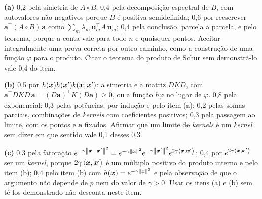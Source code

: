 \documentclass[11pt,a4paper]{article}
\begin{document}


\begin{criterio}
\textbf{(a)} 0,2 pela simetria de $A\circ B$; 0,4 pela decomposição espectral de $B$,
com autovalores não negativos porque $B$ é positiva semidefinida; 0,6 por reescrever
$\bm a^\top(A\circ B)\,\bm a$ como $\sum_m\lambda_m\,\bm u_m^\top A\,\bm u_m$; 0,4 pela
conclusão, parcela a parcela, e pelo teorema, porque a conta vale para todo $n$ e
quaisquer pontos. Aceitar integralmente uma prova correta por outro caminho, como a
construção de uma função $\varphi$ para o produto. Citar o teorema do produto de Schur
sem demonstrá-lo vale 0,4 do item.

\textbf{(b)} 0,5 por $h(\bm{x})h(\bm{x}')k(\bm{x},\bm{x}')$: a simetria e a matriz $DKD$, com
$\bm a^\top DKD\,\bm a=(D\bm a)^\top K(D\bm a)\ge0$, ou a função $h\varphi$ no lugar de
$\varphi$. 0,8 pela exponencial: 0,3 pelas potências, por indução e pelo item (a); 0,2
pelas somas parciais, combinações de \emph{kernels} com coeficientes positivos; 0,3 pela
passagem ao limite, com os pontos e $\bm a$ fixados. Afirmar que um limite de
\emph{kernels} é um \emph{kernel} sem dizer em que sentido vale 0,1 desses 0,3.

\textbf{(c)} 0,3 pela fatoração
$e^{-\gamma\left\lVert \bm{x}-\bm{x}' \right\rVert^2}=e^{-\gamma\left\lVert \bm{x} \right\rVert^2}e^{-\gamma\left\lVert \bm{x}' \right\rVert^2}e^{2\gamma\left\langle \bm{x}, \bm{x}' \right\rangle}$;
0,4 por $e^{2\gamma\left\langle \bm{x}, \bm{x}' \right\rangle}$ ser um \emph{kernel}, porque $2\gamma\left\langle \bm{x}, \bm{x}' \right\rangle$ é
um múltiplo positivo do produto interno e pelo item (b); 0,4 pelo item (b) com
$h(\bm{x})=e^{-\gamma\left\lVert \bm{x} \right\rVert^2}$ e pela observação de que o argumento não depende de $p$
nem do valor de $\gamma>0$. Usar os itens (a) e (b) sem tê-los demonstrado não desconta
neste item.
\end{criterio}


\end{document}
